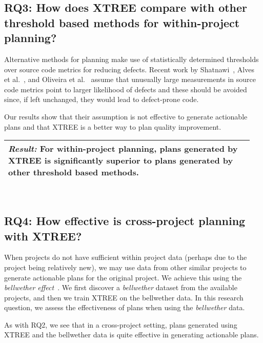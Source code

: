 \documentclass[10pt,journal,compsoc]{IEEEtran}
\begin{document}
     
\subsection*{RQ3: How does XTREE compare with other threshold based methods for within-project planning?}
    
Alternative methods for planning make use of statistically determined thresholds over source code metrics for reducing defects. Recent work by Shatnawi~\cite{shatnawi}, Alves et al.~\cite{alves}, and Oliveira et al.~\cite{oliveira} assume that unusually large measurements in source code metrics point to larger likelihood of defects and these should be avoided since, if left unchanged, they would lead to defect-prone code.  

Our results show  that their assumption is not effective to generate actionable 
plans  and that XTREE is a better way to plan quality improvement.\\[-0.1cm]

\noindent\begin{minipage}{\linewidth}
	\begin{tabular}{|p{0.95\linewidth}|}
		\arrayrulecolor{Gray}
		\hline\vspace{-0.2cm}
		\cellcolor{Gray}\textit{\textbf{Result:}} For within-project planning, plans 
		generated by XTREE is significantly superior to plans generated by other 
		threshold based methods.\\\hline
	\end{tabular}
\end{minipage}\bigstrut\\[-.4cm]


\subsection*{RQ4: How effective is cross-project planning with XTREE?}
    
When projects do not have sufficient within project data (perhaps due to the project being relatively new), we may use data from other similar projects to generate actionable plans for the original project. We achieve this using the \textit{bellwether effect}~\cite{krishna17a}. We first discover a \textit{bellwether} dataset from the available projects, and then we train XTREE on the bellwether data. In this research question, we assess the effectiveness of plans when using the \textit{bellwether} data.

As with RQ2, we see that in a cross-project setting, plans generated using 
XTREE and the bellwether data is quite effective in generating actionable 
plans.\\[-.4cm]
\end{document}
